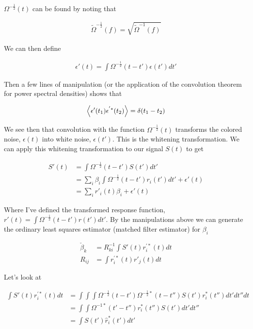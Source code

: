 \documentclass[12pt]{article}
\begin{document}
$\Omega^{-\frac{1}{2}}(t)$ can be found by noting that

\begin{align}
\tilde{\Omega}^{-\frac{1}{2}}(f) = \sqrt{\tilde{\Omega}^{-1}(f)}
\end{align}


 We can then define

\begin{align}
\epsilon'(t) = \int \Omega^{-\frac{1}{2}}(t-t') \epsilon(t') dt'
\end{align}

Then a few lines of manipulation (or the application of the convolution theorem for power spectral densities) shows that

\begin{align}
\Braket{\epsilon'(t_1)\epsilon^{'*}(t_2)} = \delta(t_1-t_2)
\end{align}

We see then that convolution with the function $\Omega^{-\frac{1}{2}}(t)$ transforms the colored noise, $\epsilon(t)$ into white noise, $\epsilon(t')$. This is the whitening transformation. We can apply this whitening transformation to our signal $S(t)$ to get

\begin{align}
S'(t) &= \int \Omega^{-\frac{1}{2}}(t-t')S(t') dt'\\
&= \sum_i \beta_i \int \Omega^{-\frac{1}{2}}(t-t')r_i(t') dt' + \epsilon'(t)\\
&= \sum_i r'_i(t) \beta_i + \epsilon'(t)
\end{align}

Where I've defined the transformed response function, $r'(t) = \int \Omega^{-\frac{1}{2}}(t-t') r(t') dt'$. By the manipulations above we can generate the ordinary least squares estimator (matched filter estimator) for $\beta_i$

\begin{align}
\check{\beta}_k &= R^{-1}_{ki} \int S'(t) r^{'*}_i(t) dt\\
R_{ij} &= \int r^{'*}_i(t) r'_j(t) dt
\end{align}

Let's look at

\begin{align}
\int S'(t) r^{'*}_i(t) dt &= \int \int \int \Omega^{-\frac{1}{2}}(t-t')\Omega^{-\frac{1}{2}*}(t-t'')S(t')r^*_i(t'') dt' dt'' dt\\
&= \int \int \Omega^{-1*}(t'-t'') r^*_i(t'')S(t') dt' dt''\\
&= \int S(t') \hat{r}^*_i(t') dt'
\end{align}
\end{document}
